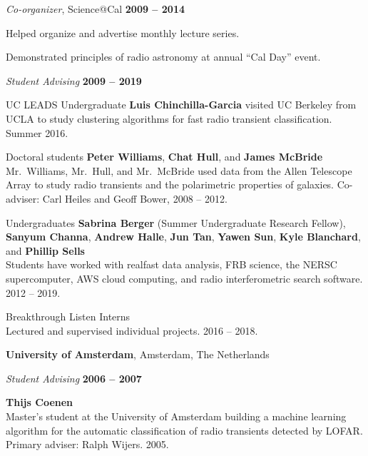\documentclass[11pt]{article}
\newcommand{\halfblankline}{\quad\vspace{-0.5\baselineskip}\pagebreak[3]}
\begin{document}
\begin{outerlist}
\item[] \textit{Co-organizer}, Science@Cal
    \hfill \textbf{2009 -- 2014}
    \begin{innerlist}
        \item Helped organize and advertise monthly lecture series.
        \item Demonstrated principles of radio astronomy at annual ``Cal Day'' event.
    \end{innerlist}

\item[] \textit{Student Advising}
    \hfill \textbf{2009 -- 2019}
    \begin{innerlist}
      \item UC LEADS Undergraduate \textbf{Luis Chinchilla-Garcia} visited UC Berkeley from UCLA to study clustering algorithms for fast radio transient classification. Summer 2016.
      \item Doctoral students \textbf{Peter Williams}, \textbf{Chat Hull}, and \textbf{James McBride} \\
        Mr.\ Williams, Mr.\ Hull, and Mr.\ McBride used data from the Allen Telescope Array to study radio transients and the polarimetric properties of galaxies. Co-adviser: Carl Heiles and Geoff Bower, 2008 -- 2012.
      \item Undergraduates \textbf{Sabrina Berger} (Summer Undergraduate Research Fellow), \textbf{Sanyum Channa}, \textbf{Andrew Halle}, \textbf{Jun Tan}, \textbf{Yawen Sun}, \textbf{Kyle Blanchard}, and \textbf{Phillip Sells} \\
        Students have worked with realfast data analysis, FRB science, the NERSC supercomputer, AWS cloud computing, and radio interferometric search software.
        2012 -- 2019.
      \item Breakthrough Listen Interns \\
        Lectured and supervised individual projects. 2016 -- 2018.
     \end{innerlist}
\end{outerlist}

\halfblankline

\textbf{University of Amsterdam}, Amsterdam, The Netherlands
\begin{outerlist}

\item[] \textit{Student Advising}
    \hfill \textbf{2006 -- 2007}
    \begin{innerlist}
       \item \textbf{Thijs Coenen}\\
        Master's student at the University of Amsterdam building 
        a machine learning algorithm for the automatic classification 
        of radio transients detected by LOFAR.
        Primary adviser: Ralph Wijers.
        2005.
     \end{innerlist}
\end{outerlist}
\end{document}
